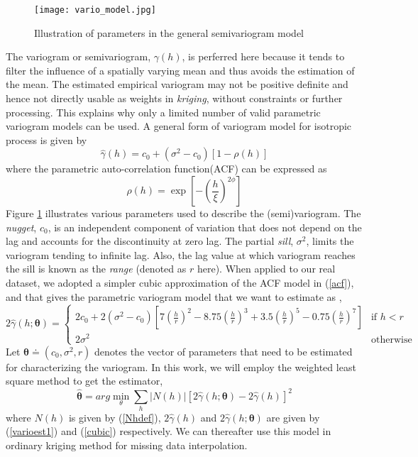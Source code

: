 \documentclass[12pt]{article}
\numberwithin{equation}{section}
\numberwithin{table}{section}
\numberwithin{figure}{section}
\begin{document}
\begin{figure} \centering
  \texttt{[image: vario\_model.jpg]}
  \caption{Illustration of parameters in the general semivariogram model}
  \label{vario_model}
\end{figure}


The variogram or semivariogram, $\gamma(h)$, 
is perferred here because it tends to filter the
influence of a spatially varying mean and thus avoids the estimation
of the mean. The estimated empirical variogram may not be positive
definite and hence not directly usable as weights in \emph{kriging}, 
without constraints or further processing. This explains why
only a limited number of valid parametric variogram models can be used.
A general form of variogram model for isotropic process is given by
\begin{equation} \label{variomod}
  \hat{\gamma}(h) = c_0 + (\sigma^2 - c_0)[ 1- \rho(h)]
\end{equation}
where the parametric auto-correlation function(ACF) can be expressed as 
\begin{equation} \label{acf}
  \rho(h) = \exp{ \left[-\left( \frac{h}{\xi} \right)^{2\phi} \right] }
\end{equation}
Figure \ref{vario_model} illustrates various parameters used to
describe the (semi)variogram. The \emph{nugget}, $c_0$, is an 
independent component of variation that does not depend on the lag
and accounts for the discontinuity at zero lag. The partial
\emph{sill}, $\sigma^2$, limits the variogram tending to infinite
lag. Also, the lag value at which variogram reaches the sill is
known as the \emph{range} (denoted as $r$ here). When applied to our
real dataset, we adopted a simpler cubic approximation 
of the ACF model in (\ref{acf}), and that gives the parametric variogram
model that we want to estimate as \cite{geoR},
\begin{equation} \label{cubic}
  2\hat{\gamma}(h;\bm{\theta}) = 
\begin{cases} 
  2c_0 + 2(\sigma^2 - c_0) 
  \left[ 7\left( \frac{h}{r} \right)^2 - 8.75\left( \frac{h}{r} \right)^3
  + 3.5\left( \frac{h}{r}\right)^5 - 0.75\left( \frac{h}{r}\right)^7
  \right] & \mbox{if $h<r$} \\
  2\sigma^2 & \mbox{otherwise}
\end{cases}
\end{equation}
Let $\bm{\theta} \doteq (c_0, \sigma^2, r)$ denotes the vector of
parameters that need to be estimated for characterizing the
variogram. In this work, we will employ the weighted least square method
to get the estimator,
\begin{equation} \label{variowls}
  \hat{\bm{\theta}} = arg\min_{\theta} \sum_h |N(h)|\left[
    2\hat{\gamma}(h; \bm{\theta}) - 2\hat{\gamma}(h) \right]^2
\end{equation}
where $N(h)$ is given by (\ref{Nhdef}), $2\hat{\gamma}(h)$ and
$2\hat{\gamma}(h;\bm{\theta})$ are given by (\ref{varioest1}) and
(\ref{cubic}) respectively. We can thereafter use this model in
ordinary kriging method for missing data interpolation. 
\end{document}
